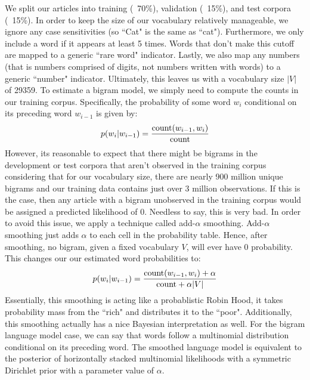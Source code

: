 \documentclass[fleqn,12pt]{SelfArx} %
\begin{document}
We split our articles into training (~70\%), validation (~15\%), and test corpora (~15\%). In order to keep the size of our vocabulary relatively manageable, we ignore any case sensitivities (so ``Cat" is the same as ``cat"). Furthermore, we only include a word if it appears at least 5 times. Words that don't make this cutoff are mapped to a generic ``rare word" indicator. Lastly, we also map any numbers (that is numbers comprised of digits, not numbers written with words) to a generic ``number" indicator. Ultimately, this leaves us with a vocabulary size $|V|$ of 29359. To estimate a bigram model, we simply need to compute the counts in our training corpus. Specifically, the probability of some word $w_i$ conditional on its preceding word $w_{i-1}$ is given by:
\begin{equation}
p(w_i|w_{i-1}) = \frac{\textnormal{count}(w_{i-1},w_i)}{\textnormal{count}}
\end{equation}
However, its reasonable to expect that there might be bigrams in the development or test corpora that aren't observed in the training corpus considering that for our vocabulary size, there are nearly 900 million unique bigrams and our training data contains just over 3 million observations. If this is the case, then any article with a bigram unobserved in the training corpus would be assigned a predicted likelihood of 0. Needless to say, this is very bad. In order to avoid this issue, we apply a technique called add-$\alpha$ smoothing. Add-$\alpha$ smoothing just adds $\alpha$ to each cell in the probability table. Hence, after smoothing, no bigram, given a fixed vocabulary $V$, will ever have 0 probability. This changes our our estimated word probabilities to:
\begin{equation}
p(w_i|w_{i-1}) = \frac{\textnormal{count}(w_{i-1},w_i) + \alpha}{\textnormal{count} + \alpha |V|}
\end{equation}
Essentially, this smoothing is acting like a probablistic Robin Hood, it takes probability mass from the ``rich" and distributes it to the ``poor". Additionally, this smoothing actually has a nice Bayesian interpretation as well. For the bigram language model case, we can say that words follow a multinomial distribution conditional on its preceding word. The smoothed language model is equivalent to the posterior of horizontally stacked multinomial likelihoods with a symmetric Dirichlet prior with a parameter value of $\alpha$. 
\end{document}
